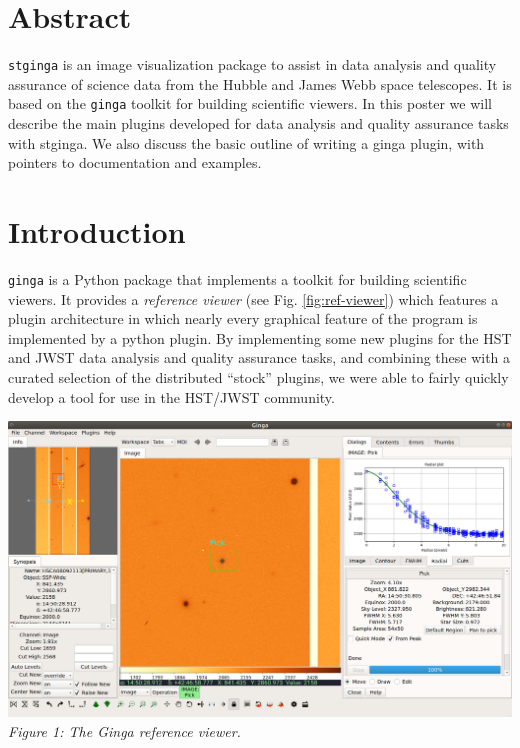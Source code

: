\documentclass[]{article}
\begin{document}
\medskip
\begin{multicols}{3}

\section*{Abstract}
{\tt stginga}\cite{stginga} is an image visualization package to assist
in data analysis and quality assurance of science data from the Hubble
and James Webb space telescopes.  It is based on the
{\tt ginga}\cite{ginga} toolkit for building scientific viewers.
In this poster we will describe the main plugins developed for data
analysis and quality assurance tasks with stginga.  We also discuss the
basic outline of writing a ginga plugin, with pointers to documentation
and examples.

\section*{Introduction}
{\tt ginga}\cite{Jeschke15A} is a Python package that
implements a toolkit for building scientific viewers.  It provides
a \emph{reference viewer} (see Fig. \ref{fig:ref-viewer}) which features
a plugin architecture in which nearly every graphical feature of the
program is implemented by a python plugin.
By implementing some new plugins for the HST and JWST data analysis and
quality assurance tasks, and combining these with a curated selection of
the distributed ``stock'' plugins, we were able to fairly quickly
develop a tool for use in the HST/JWST community.

\para
\begin{center}
\includegraphics[width=8in]{ref_viewer}
\label{fig:ref-viewer}
\vspace*{0.4em}
{\small\em Figure 1: The Ginga reference viewer.}
\end{center}


\end{multicols}
\end{document}
